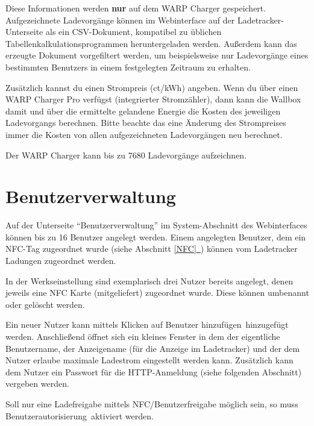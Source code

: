 \documentclass[a4paper,10pt]{article}
\newcommand*{\fullref}[1]{\hyperref[{#1}]{\ref*{#1}~\nameref*{#1}}}
\begin{document}
\begin{multicols*}{2}
	Diese Informationen werden \textbf{nur} auf dem WARP Charger gespeichert.
	Aufgezeichnete Ladevorgänge können im Webinterface auf der Ladetracker-Unterseite als ein CSV-Dokument,
	kompatibel zu üblichen Tabellenkalkulationsprogrammen heruntergeladen werden. Außerdem kann das erzeugte Dokument
	vorgefiltert werden, um beispielsweise nur Ladevorgänge eines bestimmten Benutzers in einem festgelegten Zeitraum zu erhalten.

	Zusätzlich kannst du einen Strompreis (ct/kWh) angeben. Wenn du über einen
	WARP Charger Pro verfügst (integrierter Stromzähler), dann kann die Wallbox
	damit und über die ermittelte gelandene Energie die Kosten des jeweiligen
	Ladevorgangs berechnen. Bitte beachte das eine Änderung des Strompreises
	immer die Kosten von allen aufgezeichneten Ladevorgängen neu berechnet.

	Der WARP Charger kann bis zu 7680 Ladevorgänge aufzeichnen.

	\section{Benutzerverwaltung} \label{user_management}

	Auf der Unterseite \enquote{Benutzerverwaltung} im System-Abschnitt des Webinterfaces können bis zu 16 Benutzer angelegt werden.
	Einem angelegten Benutzer, dem ein NFC-Tag zugeordnet wurde (siehe Abschnitt \fullref{NFC}) können vom Ladetracker Ladungen zugeordnet werden.

	In der Werkseinstellung sind exemplarisch drei Nutzer bereits angelegt,
	denen jeweils eine NFC Karte (mitgeliefert) zugeordnet wurde. Diese können
	umbenannt oder gelöscht werden.

	Ein neuer Nutzer kann mittels Klicken auf \glqq Benutzer hinzufügen\grqq~hinzugefügt werden.
	Anschließend öffnet sich ein kleines Fenster in dem der eigentliche Benutzername, der Anzeigename (für die Anzeige im Ladetracker)
	und der dem Nutzer erlaube maximale Ladestrom eingestellt werden kann.
	Zusätzlich kann dem Nutzer ein Passwort für die HTTP-Anmeldung (siehe
	folgenden Abschnitt) vergeben werden.

	Soll nur eine Ladefreigabe mittels NFC/Benutzerfreigabe möglich sein, so
	muss \glqq Benutzerautorisierung\grqq~aktiviert werden.


\end{multicols*}
\end{document}
